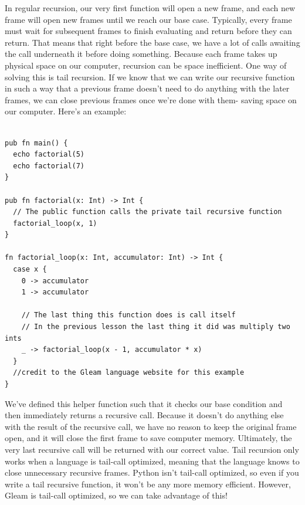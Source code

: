 \begin{blocksection}
In regular recursion, our very first function will open a new frame, and each new frame will open new frames until we reach our base case. Typically, every frame must wait for subsequent frames to finish evaluating and return before they can return. That means that right before the base case, we have a lot of calls awaiting the call underneath it before doing something. Because each frame takes up physical space on our computer, recursion can be space inefficient. One way of solving this is tail recursion. If we know that we can write our recursive function in such a way that a previous frame doesn't need to do anything with the later frames, we can close previous frames once we're done with them- saving space on our computer. 
Here's an example: 
\begin{lstlisting}

pub fn main() {
  echo factorial(5)
  echo factorial(7)
}

pub fn factorial(x: Int) -> Int {
  // The public function calls the private tail recursive function
  factorial_loop(x, 1)
}

fn factorial_loop(x: Int, accumulator: Int) -> Int {
  case x {
    0 -> accumulator
    1 -> accumulator

    // The last thing this function does is call itself
    // In the previous lesson the last thing it did was multiply two ints
    _ -> factorial_loop(x - 1, accumulator * x)
  }
  //credit to the Gleam language website for this example
}
\end{lstlisting}
We've defined this helper function such that it checks our base condition and then immediately returns a recursive call. Because it doesn't do anything else with the result of the recursive call, we have no reason to keep the original frame open, and it will close the first frame to save computer memory. Ultimately, the very last recursive call will be returned with our correct value.
Tail recursion only works when a language is tail-call optimized, meaning that the language knows to close unnecessary recursive frames. Python isn't tail-call optimized, so even if you write a tail recursive function, it won't be any more memory efficient. However, Gleam is tail-call optimized, so we can take advantage of this!
\end{blocksection}